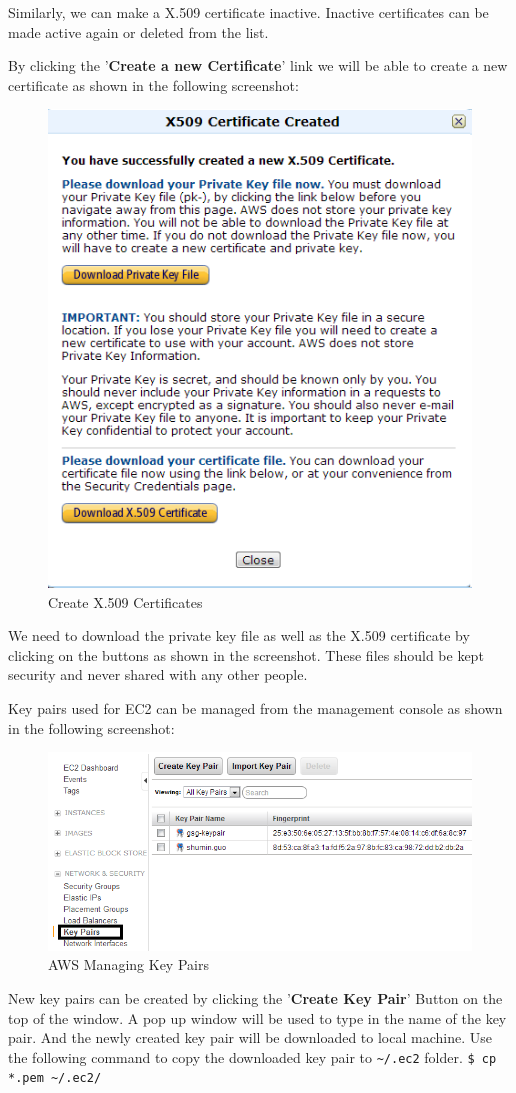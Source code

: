 Similarly, we can make a X.509 certificate inactive. Inactive certificates can be made active again or deleted from the list.

By clicking the '\textbf{Create a new Certificate}' link we will be able to create a new certificate as shown in the following screenshot:
\begin{figure}[ht]
  \centering
  \includegraphics[width=.8\textwidth]{figs/5163os_08_10.png}
  \caption{Create X.509 Certificates}\label{fig:aws.create.x509}
\end{figure} 
We need to download the private key file as well as the X.509 certificate by clicking on the buttons as shown in the screenshot. These files should be kept security and never shared with any other people.

Key pairs used for EC2 can be managed from the management console as shown in the following screenshot:
\begin{figure}[ht]
  \centering
  \includegraphics[width=.8\textwidth]{figs/5163os_08_14.png}
  \caption{AWS Managing Key Pairs}\label{fig:aws.keypair.management}
\end{figure} 
New key pairs can be created by clicking the '\textbf{Create Key Pair}' Button on the top of the window. A pop up window will be used to type in the name of the key pair. And the newly created key pair will be downloaded to local machine.
Use the following command to copy the downloaded key pair to \verb|~/.ec2| folder.
\verb|$ cp *.pem ~/.ec2/|


